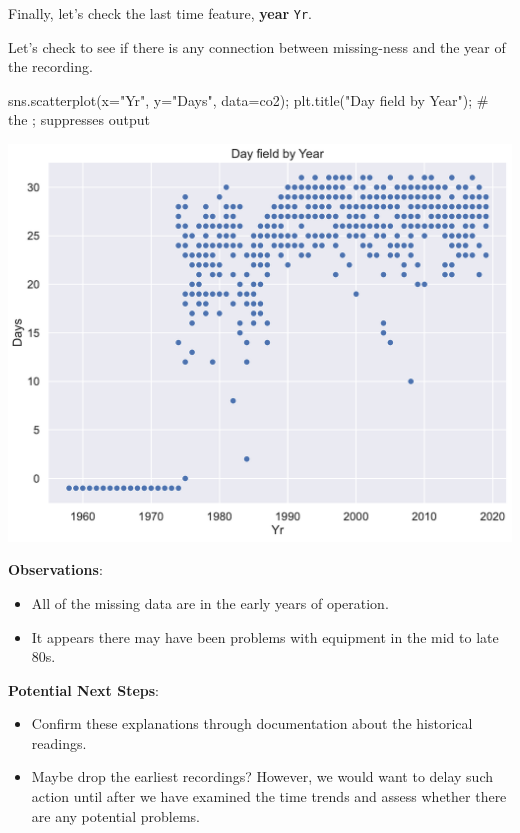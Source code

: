 \documentclass[
  letterpaper,
  DIV=11,
  numbers=noendperiod]{scrreprt}
\newenvironment{Shaded}{\begin{snugshade}}{\end{snugshade}}
\newcommand{\CommentTok}[1]{\textcolor[rgb]{0.37,0.37,0.37}{#1}}
\newcommand{\NormalTok}[1]{\textcolor[rgb]{0.00,0.23,0.31}{#1}}
\newcommand{\OperatorTok}[1]{\textcolor[rgb]{0.37,0.37,0.37}{#1}}
\newcommand{\StringTok}[1]{\textcolor[rgb]{0.13,0.47,0.30}{#1}}
\providecommand{\tightlist}{%
  \setlength{\itemsep}{0pt}\setlength{\parskip}{0pt}}\usepackage{longtable,booktabs,array}
\begin{document}
Finally, let's check the last time feature, \textbf{year} \texttt{Yr}.

Let's check to see if there is any connection between missing-ness and
the year of the recording.

\begin{Shaded}
\begin{Highlighting}[]
\NormalTok{sns.scatterplot(x}\OperatorTok{=}\StringTok{"Yr"}\NormalTok{, y}\OperatorTok{=}\StringTok{"Days"}\NormalTok{, data}\OperatorTok{=}\NormalTok{co2)}\OperatorTok{;}
\NormalTok{plt.title(}\StringTok{"Day field by Year"}\NormalTok{)}\OperatorTok{;} \CommentTok{\# the ; suppresses output}
\end{Highlighting}
\end{Shaded}

\includegraphics{eda/eda_files/figure-pdf/cell-68-output-1.pdf}

\textbf{Observations}:

\begin{itemize}
\tightlist
\item
  All of the missing data are in the early years of operation.
\item
  It appears there may have been problems with equipment in the mid to
  late 80s.
\end{itemize}

\textbf{Potential Next Steps}:

\begin{itemize}
\tightlist
\item
  Confirm these explanations through documentation about the historical
  readings.
\item
  Maybe drop the earliest recordings? However, we would want to delay
  such action until after we have examined the time trends and assess
  whether there are any potential problems.
\end{itemize}
\end{document}
